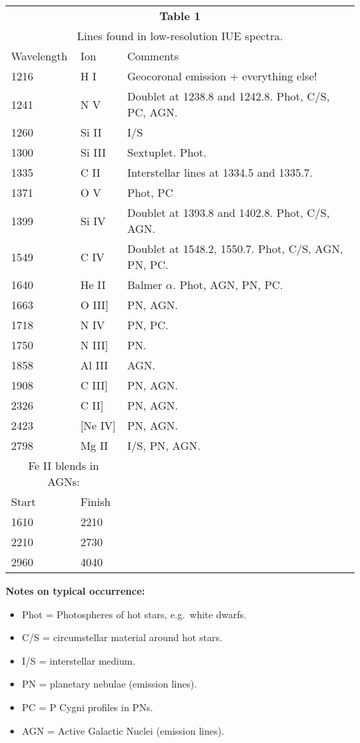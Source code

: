 \begin{center}
\begin{tabular}{lll}
\multicolumn{3}{c}{\bf Table 1} \\ 
\multicolumn{3}{c}{Lines found in low-resolution IUE spectra.} \\ \hline
Wavelength & Ion & Comments \\ \hline
1216   & H I & Geocoronal emission + everything else! \\
1241   & N V & Doublet at 1238.8 and 1242.8. Phot, C/S, PC, AGN. \\
1260   & Si II & I/S \\
1300   & Si III & Sextuplet. Phot. \\
1335   & C II  & Interstellar lines at 1334.5 and 1335.7. \\
1371   & O V   & Phot, PC \\
1399   & Si IV & Doublet at 1393.8 and 1402.8. Phot, C/S, AGN. \\
1549   & C IV & Doublet at 1548.2, 1550.7. Phot, C/S, AGN, PN, PC. \\
1640   & He II & Balmer $\alpha$. Phot, AGN, PN, PC.  \\
1663   & O III] & PN, AGN.\\
1718   & N IV & PN, PC. \\
1750   & N III] & PN. \\
1858   & Al III & AGN. \\
1908   & C III] & PN, AGN. \\ 
2326   & C II]  & PN, AGN. \\
2423  & [Ne IV] & PN, AGN. \\
2798  & Mg II & I/S, PN, AGN. \\
\multicolumn{2}{c}{Fe II blends in AGNs:} & \\
Start & Finish & \\
1610 & 2210 & \\
2210 & 2730 & \\
2960 & 4040 & \\ \hline
\end{tabular}
\end{center}
{\bf Notes on typical occurrence:} 
\begin{itemize}
\item Phot =  Photospheres of hot stars, e.g.\ white dwarfs. 
\item C/S = circumstellar material around hot stars.
\item I/S = interstellar medium. 
\item PN = planetary nebulae (emission lines). 
\item PC = P Cygni profiles in PNs.
\item AGN = Active Galactic Nuclei (emission lines). 
\end{itemize}


